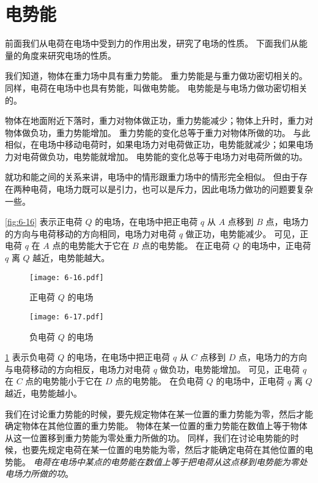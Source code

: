 \section{电势能}
前面我们从电荷在电场中受到力的作用出发，研究了电场的性质。
下面我们从能量的角度来研究电场的性质。

我们知道，物体在重力场中具有重力势能。
重力势能是与重力做功密切相关的。
同样，电荷在电场中也具有势能，叫做电势能。
电势能是与电场力做功密切相关的。

物体在地面附近下落时，重力对物体做正功，重力势能减少；物体上升时，重力对物体做负功，重力势能增加。
重力势能的变化总等于重力对物体所做的功。
与此相似，在电场中移动电荷时，如果电场力对电荷做正功，电势能就减少；如果电场力对电荷做负功，电势能就增加。
电势能的变化总等于电场力对电荷所做的功。

就功和能之间的关系来讲，电场中的情形跟重力场中的情形完全相似。
但由于存在两种电荷，电场力既可以是引力，也可以是斥力，因此电场力做功的问题要复杂一些。

\cref{fig:6-16} 表示正电荷 $Q$ 的电场，在电场中把正电荷 $q$ 从 $A$ 点移到 $B$ 点，电场力的方向与电荷移动的方向相同，电场力对电荷 $q$ 做正功，电势能减少。
可见，正电荷 $q$ 在 $A$ 点的电势能大于它在 $B$ 点的电势能。
在正电荷 $Q$ 的电场中，正电荷 $q$ 离 $Q$ 越近，电势能越大。
\begin{figure}
	\begin{minipage}[b]{0.48\linewidth}\centering
		\texttt{[image: 6-16.pdf]}
		\caption{正电荷 $Q$ 的电场}\label{fig:6-16}
	\end{minipage}
	\begin{minipage}[b]{0.48\linewidth}\centering
		\texttt{[image: 6-17.pdf]}
		\caption{负电荷 $Q$ 的电场}\label{fig:6-17}
	\end{minipage}
\end{figure}

\cref{fig:6-17} 表示负电荷 $Q$ 的电场，在电场中把正电荷 $q$ 从 $C$ 点移到 $D$ 点，电场力的方向与电荷移动的方向相反，电场力对电荷 $q$ 做负功，电势能增加。
可见，正电荷 $q$ 在 $C$ 点的电势能小于它在 $D$ 点的电势能。
在负电荷 $Q$ 的电场中，正电荷 $q$ 离 $Q$ 越近，电势能越小。

我们在讨论重力势能的时候，要先规定物体在某一位置的重力势能为零，然后才能确定物体在其他位置的重力势能。
物体在某一位置的重力势能在数值上等于物体从这一位置移到重力势能为零处重力所做的功。
同样，我们在讨论电势能的时候，也要先规定电荷在某一位置的电势能为零，然后才能确定电荷在其他位置的电势能。
\emph{电荷在电场中某点的电势能在数值上等于把电荷从这点移到电势能为零处电场力所做的功}。


